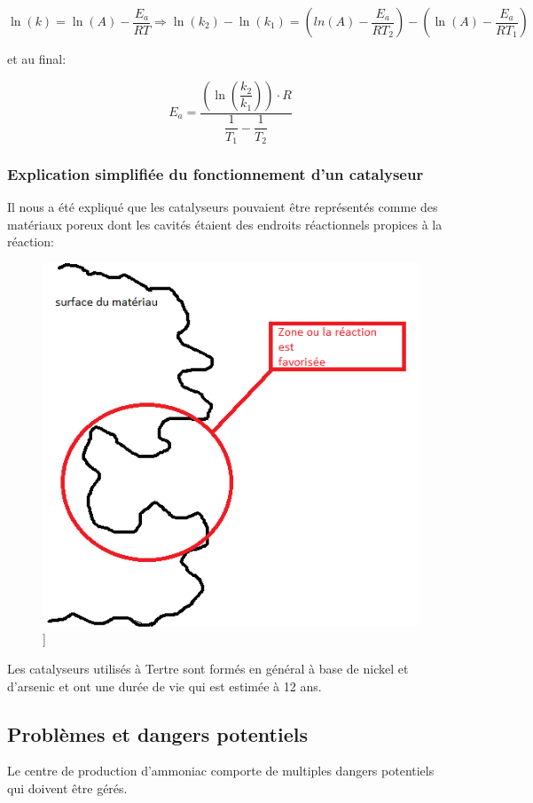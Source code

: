 $$\ln(k) = \ln(A) - \dfrac{E_a}{RT}   \Rightarrow   \ln(k_2) - \ln(k_1) = \left( ln(A) - \dfrac{E_a}{RT_2} \right) - \left( \ln(A) - \dfrac{E_a}{RT_1} \right)$$

et au final:

$$E_a = \dfrac{\left( \ln \left( \dfrac{k_2}{k_1}\right) \right) \cdot R}{\dfrac{1}{T_1} - \dfrac{1}{T_2}}$$

\subsubsection{Explication simplifiée du fonctionnement d'un catalyseur}
Il nous a été expliqué que les catalyseurs pouvaient être représentés comme des matériaux poreux dont les cavités étaient des endroits réactionnels propices à la réaction:

\begin{figure} [h]
\begin{center}
\includegraphics[scale=0.5]{cata}]
\end{center}
\end{figure}

Les catalyseurs utilisés à Tertre sont formés en général à base de nickel et d'arsenic et ont une durée de vie qui est estimée à 12 ans.

\subsection{Problèmes et dangers potentiels}
Le centre de production d'ammoniac comporte de multiples dangers potentiels qui doivent être gérés. 

